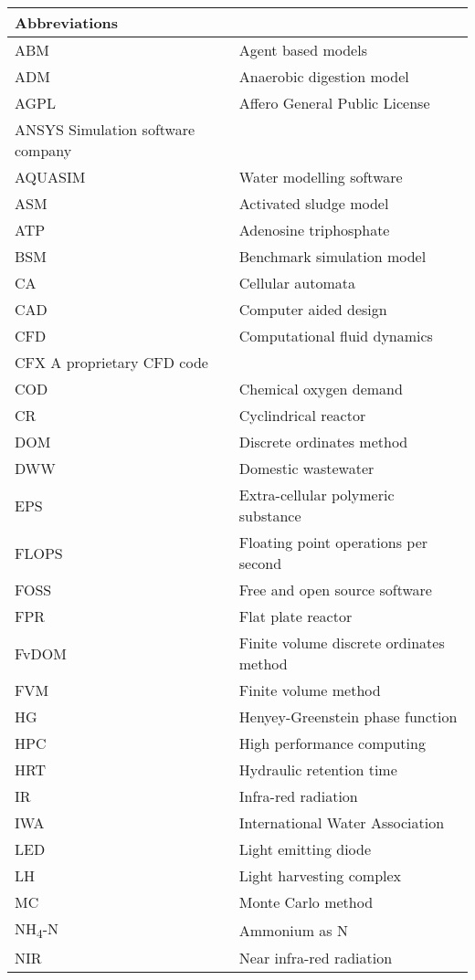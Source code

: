 \begin{center}
	\small
	\begin{longtable}{ll}
	\toprule
	Abbreviations & {} \\
	\bottomrule
ABM	&	Agent based models	\\
ADM	&	Anaerobic digestion model	\\
AGPL	&	Affero General Public License	\\
ANSYS		Simulation software company	\\
AQUASIM	&	Water modelling software	\\
ASM	&	Activated sludge model	\\
ATP	&	Adenosine triphosphate	\\
BSM	&	Benchmark simulation model	\\
CA	&	Cellular automata	\\
CAD	&	Computer aided design	\\
CFD	&	Computational fluid dynamics	\\
CFX		A proprietary CFD code	\\
COD	&	Chemical oxygen demand	\\
CR	&	Cyclindrical reactor	\\
DOM	&	Discrete ordinates method	\\
DWW	&	Domestic wastewater	\\
EPS	&	Extra-cellular polymeric substance	\\
FLOPS	&	Floating point operations per second	\\
FOSS	&	Free and open source software	\\
FPR	&	Flat plate reactor	\\
FvDOM	&	Finite volume discrete ordinates method	\\
FVM	&	Finite volume method	\\
HG	&	Henyey-Greenstein phase function	\\
HPC	&	High performance computing	\\
HRT	&	Hydraulic retention time	\\
IR	&	Infra-red radiation	\\
IWA	&	International Water Association	\\
LED	&	Light emitting diode	\\
LH	&	Light harvesting complex	\\
MC	&	Monte Carlo method	\\
NH\textsubscript{4}-N	&	Ammonium as N	\\
NIR	&	Near infra-red radiation	\\

\end{longtable}
\end{center}
